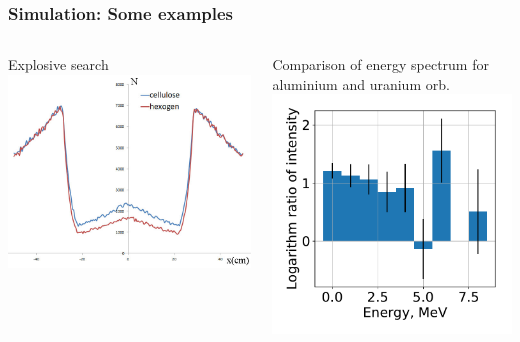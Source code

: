 \documentclass[11pt]{beamer}
\begin{document}
\begin{frame}
    \frametitle{Simulation: Some examples}
    \begin{columns}
        \begin{column}{0.5\textwidth}
            \centering Explosive search\\
            \includegraphics[width=1\textwidth]{figures/sim_hexogen.jpeg}
            
        \end{column}
        \begin{column}{0.5\textwidth}
            Comparison of energy spectrum for aluminium and uranium orb.\\
            \includegraphics[width=1\textwidth]{figures/Difference.pdf}
        \end{column}
    \end{columns}  
\end{frame}
\end{document}
